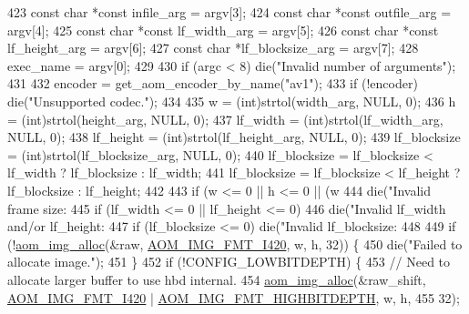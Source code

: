 \begin{DoxyCodeInclude}
{{{{{{{{{{423   \textcolor{keyword}{const} \textcolor{keywordtype}{char} *\textcolor{keyword}{const} infile\_arg = argv[3];
424   \textcolor{keyword}{const} \textcolor{keywordtype}{char} *\textcolor{keyword}{const} outfile\_arg = argv[4];
425   \textcolor{keyword}{const} \textcolor{keywordtype}{char} *\textcolor{keyword}{const} lf\_width\_arg = argv[5];
426   \textcolor{keyword}{const} \textcolor{keywordtype}{char} *\textcolor{keyword}{const} lf\_height\_arg = argv[6];
427   \textcolor{keyword}{const} \textcolor{keywordtype}{char} *lf\_blocksize\_arg = argv[7];
428   exec\_name = argv[0];
429 
430   \textcolor{keywordflow}{if} (argc < 8) die(\textcolor{stringliteral}{"Invalid number of arguments"});
431 
432   encoder = get\_aom\_encoder\_by\_name(\textcolor{stringliteral}{"av1"});
433   \textcolor{keywordflow}{if} (!encoder) die(\textcolor{stringliteral}{"Unsupported codec."});
434 
435   w = (int)strtol(width\_arg, NULL, 0);
436   h = (int)strtol(height\_arg, NULL, 0);
437   lf\_width = (int)strtol(lf\_width\_arg, NULL, 0);
438   lf\_height = (int)strtol(lf\_height\_arg, NULL, 0);
439   lf\_blocksize = (int)strtol(lf\_blocksize\_arg, NULL, 0);
440   lf\_blocksize = lf\_blocksize < lf\_width ? lf\_blocksize : lf\_width;
441   lf\_blocksize = lf\_blocksize < lf\_height ? lf\_blocksize : lf\_height;
442 
443   \textcolor{keywordflow}{if} (w <= 0 || h <= 0 || (w %
444     die(\textcolor{stringliteral}{"Invalid frame size: %
445   \textcolor{keywordflow}{if} (lf\_width <= 0 || lf\_height <= 0)
446     die(\textcolor{stringliteral}{"Invalid lf\_width and/or lf\_height: %
447   \textcolor{keywordflow}{if} (lf\_blocksize <= 0) die(\textcolor{stringliteral}{"Invalid lf\_blocksize: %
448 
449   \textcolor{keywordflow}{if} (!\hyperlink{aom__image_8h_a570db29fbd122951235a08fe9375f6bb}{aom\_img\_alloc}(&raw, \hyperlink{aom__image_8h_a930317c04b4bd0a660bb5e744055523cabd778a3d697463e89d12a1117f417b60}{AOM\_IMG\_FMT\_I420}, w, h, 32)) \{
450     die(\textcolor{stringliteral}{"Failed to allocate image."});
451   \}
452   \textcolor{keywordflow}{if} (!CONFIG\_LOWBITDEPTH) \{
453     \textcolor{comment}{// Need to allocate larger buffer to use hbd internal.}
454     \hyperlink{aom__image_8h_a570db29fbd122951235a08fe9375f6bb}{aom\_img\_alloc}(&raw\_shift, \hyperlink{aom__image_8h_a930317c04b4bd0a660bb5e744055523cabd778a3d697463e89d12a1117f417b60}{AOM\_IMG\_FMT\_I420} | 
      \hyperlink{aom__image_8h_a607b37d91f75442f54223ecd85f1b6cb}{AOM\_IMG\_FMT\_HIGHBITDEPTH}, w, h,
455                   32);
}}}}}}}}}}}}}
\end{DoxyCodeInclude}
